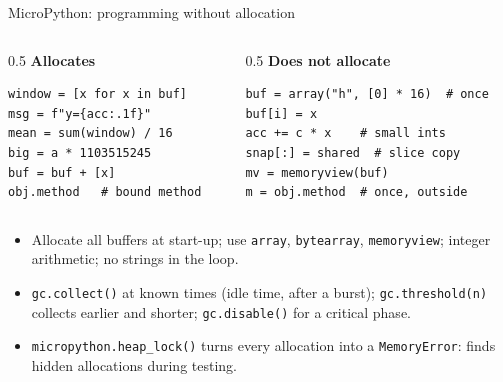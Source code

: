 \begin{frame}[fragile]{MicroPython: programming without allocation}
  \begin{columns}[T]
    \begin{column}{0.5\textwidth}
      \small
      \textbf{Allocates}
\begin{lstlisting}[style=python,numbers=none]
window = [x for x in buf]
msg = f"y={acc:.1f}"
mean = sum(window) / 16
big = a * 1103515245
buf = buf + [x]
obj.method   # bound method
\end{lstlisting}
    \end{column}
    \begin{column}{0.5\textwidth}
      \small
      \textbf{Does not allocate}
\begin{lstlisting}[style=python,numbers=none]
buf = array("h", [0] * 16)  # once
buf[i] = x
acc += c * x    # small ints
snap[:] = shared  # slice copy
mv = memoryview(buf)
m = obj.method  # once, outside
\end{lstlisting}
    \end{column}
  \end{columns}
  \begin{itemize}
    \item Allocate all buffers at start-up; use \texttt{array}, \texttt{bytearray}, \texttt{memoryview}; integer arithmetic; no strings in the loop.
    \item \texttt{gc.collect()} at known times (idle time, after a burst); \texttt{gc.threshold(n)} collects earlier and shorter; \texttt{gc.disable()} for a critical phase.
    \item \texttt{micropython.heap\_lock()} turns every allocation into a \texttt{MemoryError}: finds hidden allocations during testing.
  \end{itemize}
\end{frame}

